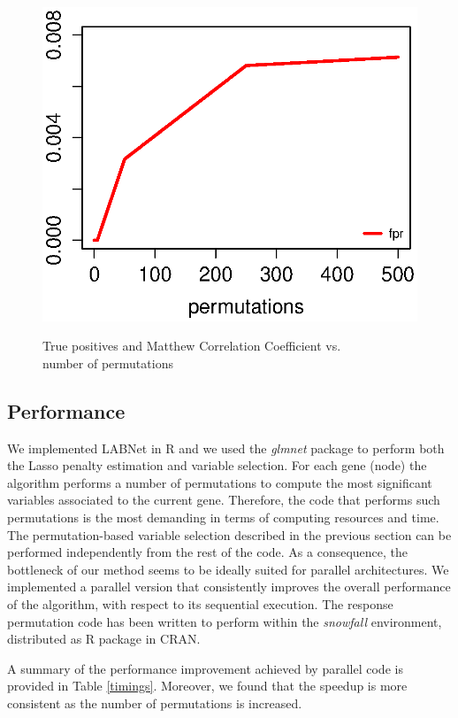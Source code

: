 \begin{figure}
\begin{minipage}{.55\textwidth}
  \caption{True positives and Matthew Correlation Coefficient vs. \\ number of permutations}
  \label{fig:tp_mcc}
\end{minipage}%
\begin{minipage}{.55\textwidth}
  \centering
  \includegraphics[width=.8\linewidth]{fpr.eps}
  \label{fig:fpr_perm}
\end{minipage}
\label{fig:global}
\end{figure}

\subsection{Performance}
We implemented LABNet in R and we used the \emph{glmnet} package to perform both the Lasso penalty estimation and variable selection. 
For each gene (node) the algorithm performs a number of permutations to compute the most significant variables associated to the current gene. Therefore, the code that performs such permutations is the most demanding in terms of computing resources and time. The permutation-based variable selection described in the previous section can be performed independently from the rest of the code. As a consequence, the bottleneck of our method seems to be ideally suited for parallel architectures. 
We implemented a parallel version that consistently improves the overall performance of the algorithm, with respect to its sequential execution.
The response permutation code has been written to perform within the \emph{snowfall} environment, distributed as R package in CRAN.
 
 A summary of the performance improvement achieved by parallel code is provided in Table \ref{timings}. Moreover, we found that the speedup is more consistent as the number of permutations is increased. 
 
